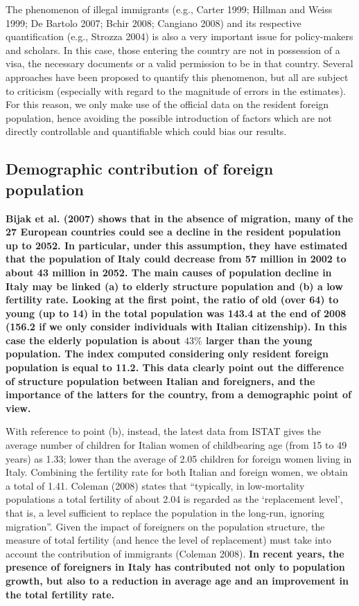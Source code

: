 \documentclass[10pt] {article}
\theoremstyle{definition}
\theoremstyle{plain}
\begin{document}
The phenomenon of illegal immigrants (e.g., Carter 1999; Hillman and Weiss 1999; De Bartolo 2007; Bchir 2008; Cangiano 2008) and its respective quantification (e.g., Strozza 2004) is also a very important issue for policy-makers and scholars. In this case, those entering the country are not in possession of a visa, the necessary documents or a valid permission to be in that country. Several approaches have been proposed to quantify this phenomenon, but all are subject to criticism (especially with regard to the magnitude of errors in the estimates). For this reason, we only make use of the official data on the resident foreign population, hence avoiding the possible introduction of factors which are not directly controllable and quantifiable which could bias our results. 


\subsection{Demographic contribution of foreign population \label{DEM}}

\textbf{Bijak et al. (2007) shows that in the absence of migration, many of the 27 European countries could see a decline in the resident population up to 2052. In particular, under this assumption, they have estimated that the population of Italy could decrease from 57 million in 2002 to about 43 million in 2052. The main causes of population decline in Italy may be linked (a) to elderly structure population and (b) a low fertility rate. Looking at the first point, the ratio of old (over 64) to young (up to 14) in the total population was 143.4 at the end of 2008 (156.2 if we only consider individuals with Italian citizenship). In this case the elderly population is about $43\%$ larger than the young population. The index computed considering only resident foreign population is equal to 11.2. This data clearly point out the difference of structure population between Italian and foreigners, and the importance of the latters for the country, from a demographic point of view. } 

With reference to point (b), instead, the latest data from ISTAT gives the average number of children for Italian women of childbearing age (from 15 to 49 years) as 1.33; lower than the average of 2.05 children for foreign women living in Italy. Combining the fertility rate for both Italian and foreign women, we obtain a total of 1.41. Coleman (2008) states that ``typically, in low-mortality populations a total fertility of about 2.04 is regarded as the `replacement level', that is, a level sufficient to replace the population in the long-run, ignoring migration''. Given the impact of foreigners on the population structure, the measure of total fertility (and hence the level of replacement) must take into account the contribution of immigrants (Coleman 2008). \textbf{In recent years, the presence of foreigners in Italy has contributed not only to population growth, but also to a reduction in average age  and an improvement in the total fertility rate.} 
\end{document}
